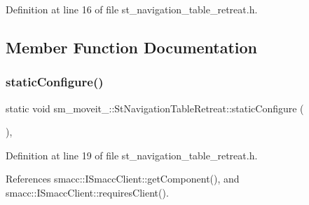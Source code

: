 Definition at line 16 of file st\+\_\+navigation\+\_\+table\+\_\+retreat.\+h.



\subsection{Member Function Documentation}
\mbox{\label{structsm__moveit__4_1_1StNavigationTableRetreat_a499aca1e3a8cf140072466558bf99cf8}} 
\subsubsection{\texorpdfstring{static\+Configure()}{staticConfigure()}}
{\footnotesize\ttfamily static void sm\+\_\+moveit\+\_\+::\+St\+Navigation\+Table\+Retreat\+::static\+Configure (\begin{DoxyParamCaption}{ }\end{DoxyParamCaption})\hspace{0.3cm}{\ttfamily [inline]}, {\ttfamily [static]}}



Definition at line 19 of file st\+\_\+navigation\+\_\+table\+\_\+retreat.\+h.



References smacc\+::\+I\+Smacc\+Client\+::get\+Component(), and smacc\+::\+I\+Smacc\+Client\+::requires\+Client().


